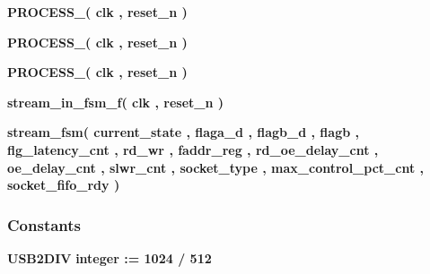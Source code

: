 \begin{DoxyCompactItemize}
\item 
{\bf P\+R\+O\+C\+E\+S\+S\+\_}{\bfseries  ( {\bfseries {\bfseries {\bf clk}} \textcolor{vhdlchar}{ }} , {\bfseries {\bfseries {\bf reset\+\_\+n}} \textcolor{vhdlchar}{ }} )}
\item 
{\bf P\+R\+O\+C\+E\+S\+S\+\_}{\bfseries  ( {\bfseries {\bfseries {\bf clk}} \textcolor{vhdlchar}{ }} , {\bfseries {\bfseries {\bf reset\+\_\+n}} \textcolor{vhdlchar}{ }} )}
\item 
{\bf P\+R\+O\+C\+E\+S\+S\+\_}{\bfseries  ( {\bfseries {\bfseries {\bf clk}} \textcolor{vhdlchar}{ }} , {\bfseries {\bfseries {\bf reset\+\_\+n}} \textcolor{vhdlchar}{ }} )}
\item 
{\bf stream\+\_\+in\+\_\+fsm\+\_\+f}{\bfseries  ( {\bfseries {\bfseries {\bf clk}} \textcolor{vhdlchar}{ }} , {\bfseries {\bfseries {\bf reset\+\_\+n}} \textcolor{vhdlchar}{ }} )}
\item 
{\bf stream\+\_\+fsm}{\bfseries  ( {\bfseries {\bfseries {\bf current\+\_\+state}} \textcolor{vhdlchar}{ }} , {\bfseries {\bfseries {\bf flaga\+\_\+d}} \textcolor{vhdlchar}{ }} , {\bfseries {\bfseries {\bf flagb\+\_\+d}} \textcolor{vhdlchar}{ }} , {\bfseries {\bfseries {\bf flagb}} \textcolor{vhdlchar}{ }} , {\bfseries {\bfseries {\bf flg\+\_\+latency\+\_\+cnt}} \textcolor{vhdlchar}{ }} , {\bfseries {\bfseries {\bf rd\+\_\+wr}} \textcolor{vhdlchar}{ }} , {\bfseries {\bfseries {\bf faddr\+\_\+reg}} \textcolor{vhdlchar}{ }} , {\bfseries {\bfseries {\bf rd\+\_\+oe\+\_\+delay\+\_\+cnt}} \textcolor{vhdlchar}{ }} , {\bfseries {\bfseries {\bf oe\+\_\+delay\+\_\+cnt}} \textcolor{vhdlchar}{ }} , {\bfseries {\bfseries {\bf slwr\+\_\+cnt}} \textcolor{vhdlchar}{ }} , {\bfseries {\bfseries {\bf socket\+\_\+type}} \textcolor{vhdlchar}{ }} , {\bfseries {\bfseries {\bf max\+\_\+control\+\_\+pct\+\_\+cnt}} \textcolor{vhdlchar}{ }} , {\bfseries {\bfseries {\bf socket\+\_\+fifo\+\_\+rdy}} \textcolor{vhdlchar}{ }} )}
\end{DoxyCompactItemize}
\subsubsection*{Constants}
 \begin{DoxyCompactItemize}
\item 
{\bf U\+S\+B2\+D\+IV} {\bfseries \textcolor{comment}{integer}\textcolor{vhdlchar}{ }\textcolor{vhdlchar}{ }\textcolor{vhdlchar}{\+:}\textcolor{vhdlchar}{=}\textcolor{vhdlchar}{ }\textcolor{vhdlchar}{ } \textcolor{vhdldigit}{1024} \textcolor{vhdlchar}{/}\textcolor{vhdlchar}{ } \textcolor{vhdldigit}{512} \textcolor{vhdlchar}{ }} 
\end{DoxyCompactItemize}
